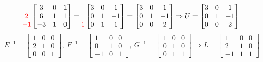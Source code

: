 \documentclass[reqno]{amsart}
\theoremstyle{definition}
\begin{document}
\begin{itemize}
\begin{enumerate}
\begin{equation*}
\begin{matrix}
\\
{\color{red}2}\\
{\color{red}-1}
\end{matrix}
\begin{bmatrix}
3 & 0 & 1\\
6 & 1 & 1\\
-3 & 1 & 0
\end{bmatrix} = \begin{matrix}
\\
\\
{\color{red}1}
\end{matrix}
\begin{bmatrix}
3 & 0 & 1\\
0 & 1 & -1\\
0 & 1 & 1
\end{bmatrix} = \begin{bmatrix}
3 & 0 & 1\\
0 & 1 & -1\\
0 & 0 & 2
\end{bmatrix} \Rightarrow U = \begin{bmatrix}
3 & 0 & 1\\
0 & 1 & -1\\
0 & 0 & 2
\end{bmatrix}
\end{equation*}
%
\begin{equation*}
E^{-1} = \begin{bmatrix}
1 & 0 & 0\\
2 & 1 & 0\\
0 & 0 & 1
\end{bmatrix},\,
F^{-1} = \begin{bmatrix}
1 & 0 & 0\\
0 & 1 & 0\\
-1 & 0 & 1
\end{bmatrix},\,
G^{-1} = \begin{bmatrix}
1 & 0 & 0\\
0 & 1 & 0\\
0 & 1 & 1
\end{bmatrix} \Rightarrow
L = \begin{bmatrix}
1 & 0 & 0\\
2 & 1 & 0\\
-1 & 1 & 1
\end{bmatrix}
\end{equation*}


\end{enumerate}



\end{itemize}
\end{document}
